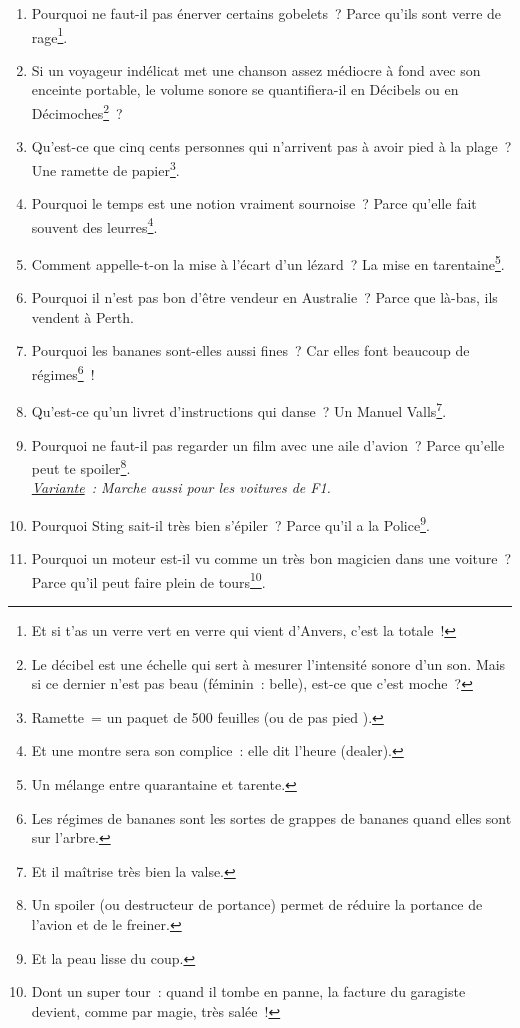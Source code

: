 \documentclass[10pt,a5paper,fullpage]{book}
\begin{document}
\begin{enumerate}
		\item Pourquoi ne faut-il pas énerver certains gobelets~? Parce qu’ils sont verre de rage\footnote{Et si t’as un verre vert en verre qui vient d’Anvers, c’est la totale~!}.
		\item Si un voyageur indélicat met une chanson assez médiocre à fond avec son enceinte portable, le volume sonore se quantifiera-il en Décibels ou en Décimoches\footnote{Le décibel est une échelle qui sert à mesurer l'intensité sonore d’un son. Mais si ce dernier n’est pas beau (féminin~: belle), est-ce que c’est moche~?}~?
		\item Qu’est-ce que cinq cents personnes qui n’arrivent pas à avoir pied à la plage~? Une ramette de papier\footnote{Ramette = un paquet de 500 feuilles (ou de \guillemotleft pas pied \guillemotright).}.
		\item Pourquoi le temps est une notion vraiment sournoise~? Parce qu’elle fait souvent des leurres\footnote{Et une montre sera son complice~: elle dit l'heure (dealer).}.
		\item Comment appelle-t-on la mise à l’écart d’un lézard~? La mise en tarentaine\footnote{Un mélange entre quarantaine et tarente.}.
		\item Pourquoi il n'est pas bon d'être vendeur en Australie~? Parce que là-bas, ils vendent à Perth. 
		\item Pourquoi les bananes sont-elles aussi fines~? Car elles font beaucoup de régimes\footnote{Les régimes de bananes sont les sortes de grappes de bananes quand elles sont sur l'arbre.}~!
		\item Qu’est-ce qu’un livret d’instructions qui danse~? Un Manuel Valls\footnote{Et il maîtrise très bien la valse.}.
		\item Pourquoi ne faut-il pas regarder un film avec une aile d’avion~? Parce qu’elle peut te spoiler\footnote{Un spoiler (ou destructeur de portance) permet de réduire la portance de l'avion et de le freiner.}. \\\textit{\underline{Variante}~: Marche aussi pour les voitures de F1.}
		\item Pourquoi Sting sait-il très bien s’épiler~? Parce qu’il a la Police\footnote{Et la peau lisse du coup.}. 
		\item Pourquoi un moteur est-il vu comme un très bon magicien dans une voiture~? Parce qu'il peut faire plein de tours\footnote{Dont un super tour~: quand il tombe en panne, la facture du garagiste devient, comme par magie, très salée~!}.

\end{enumerate}
\end{document}
